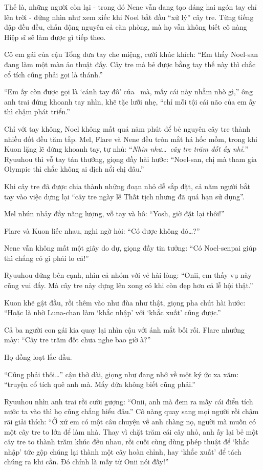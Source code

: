 \documentclass[../main.tex]{subfiles}
\begin{document}
Thế là, những người còn lại - trong đó Nene vẫn đang tạo dáng hai ngón tay chỉ lên trời - đứng nhìn như xem xiếc khi Noel bắt đầu ``xử lý'' cây tre. Từng tiếng đập đều đều, chấn động nguyên cả căn phòng, mà họ vẫn không biết cô nàng Hiệp sĩ sẽ làm được gì tiếp theo.

Cô em gái của cậu Tổng đưa tay che miệng, cười khúc khích: ``Em thấy Noel-san đang làm một màn ảo thuật đấy. Cây tre mà bẻ được bằng tay thế này thì chắc cổ tích cũng phải gọi là thánh.''

``Em ấy còn được gọi là `cánh tay đô' của \hll\ mà, mấy cái này nhằm nhò gì,'' ông anh trai đứng khoanh tay nhìn, khẽ tặc lưỡi nhẹ, ``chỉ mỗi tội cái não của em ấy thì chậm phát triển.''

Chỉ với tay không, Noel không mất quá năm phút để bẻ nguyên cây tre thành nhiều đốt đều tăm tắp. Mel, Flare và Nene đều tròn mắt há hốc mồm, trong khi Kuon lặng lẽ đứng khoanh tay, tự nhủ: ``\textit{Nhìn như\dots\ cây tre trăm đốt ấy nhỉ.}'' Ryuuhou thì vỗ tay tán thưởng, giọng đầy hài hước: ``Noel-san, chị mà tham gia Olympic thì chắc không ai địch nổi chị đâu.''

Khi cây tre đã được chia thành những đoạn nhỏ dễ sắp đặt, cả năm người bắt tay vào việc dựng lại ``cây tre ngày lễ Thất tịch nhưng đã quá hạn sử dụng''.

Mel nhún nhảy đầy năng lượng, vỗ tay và hô: ``Yosh, giờ đặt lại thôi!''

Flare và Kuon liếc nhau, nghi ngờ hỏi: ``Có được không đó\dots?''

Nene vẫn không mất một giây do dự, giọng đầy tin tưởng: ``Có Noel-senpai giúp thì chẳng có gì phải lo cả!''

Ryuuhou đứng bên cạnh, nhìn cả nhóm với vẻ hài lòng: ``Onii, em thấy vụ này cũng vui đấy. Mà cây tre này dựng lên xong có khi còn đẹp hơn cả lễ hội thật.''


Kuon khẽ gật đầu, rồi thêm vào như đùa như thật, giọng pha chút hài hước: ``Hoặc là nhờ Luna-chan làm `khắc nhập' với `khắc xuất' cũng được.''

Cả ba người con gái kia quay lại nhìn cậu với ánh mắt bối rối. Flare nhướng mày: ``Cây tre trăm đốt chưa nghe bao giờ à?''

Họ đồng loạt lắc đầu.

``Cũng phải thôi\dots'' cậu thở dài, giọng như đang nhớ về một ký ức xa xăm: ``truyện cổ tích quê anh mà. Mấy đứa không biết cũng phải.''

Ryuuhou nhìn anh trai rồi cười gượng: ``Onii, anh mà đem ra mấy cái điển tích nước ta vào thì họ cũng chẳng hiểu đâu.'' Cô nàng quay sang mọi người rồi chậm rãi giải thích: ``Ở xứ em có một câu chuyện về anh chàng nọ, người mà muốn có một cây tre to lớn để làm nhà. Thay vì chặt trăm cái cây nhỏ, anh ấy lại bẻ một cây tre to thành trăm khúc đều nhau, rồi cuối cùng dùng phép thuật để `khắc nhập' tức gộp chúng lại thành một cây hoàn chỉnh, hay `khắc xuất' để tách chúng ra khi cần. Đó chính là mấy từ Onii nói đấy!''
\end{document}
